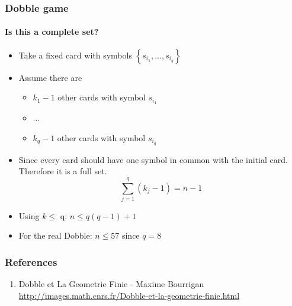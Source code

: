 \documentclass{beamer}
\begin{document}
  \begin{frame}
  	\frametitle{Dobble game}
	\framesubtitle{Is this a complete set?}
	\begin{itemize}
		\item Take a fixed card with symbols $\left\{s_{i_1},\dots,s_{i_q}\right\}$
		\item Assume there are
			\begin{itemize}
				\item $k_1 - 1$ other cards with symbol $s_{i_1}$
				\item $\dots$
				\item $k_q - 1$ other cards with symbol $s_{i_q}$
			\end{itemize}
		\item Since every card should have one symbol in common with the initial card. Therefore it is a full set. \[
		\sum_{j = 1}^q \left(k_j - 1\right) = n - 1
	\]
		\item Using $k \leq$ q: $n \leq q\left(q - 1\right) + 1$
		\item For the real Dobble: $n \leq 57$ since $q = 8$
	\end{itemize}
  \end{frame}
  \begin{frame}
  	\frametitle{References}
	\begin{enumerate}
		\item Dobble et La Geometrie Finie - Maxime Bourrigan \\
		{\scriptsize\url{http://images.math.cnrs.fr/Dobble-et-la-geometrie-finie.html}}
	\end{enumerate}
  \end{frame}
\end{document}
